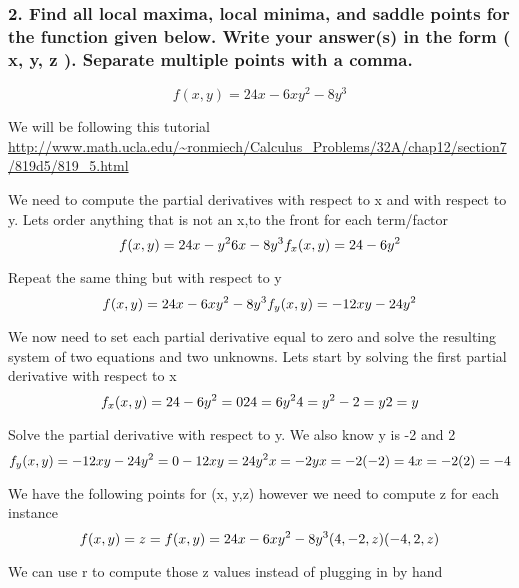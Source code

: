 \documentclass[
]{article}
\begin{document}
\hypertarget{find-all-local-maxima-local-minima-and-saddle-points-for-the-function-given-below.-write-your-answers-in-the-form-x-y-z-.-separate-multiple-points-with-a-comma.}{%
\subsubsection{2. Find all local maxima, local minima, and saddle points
for the function given below. Write your answer(s) in the form ( x, y, z
). Separate multiple points with a
comma.}\label{find-all-local-maxima-local-minima-and-saddle-points-for-the-function-given-below.-write-your-answers-in-the-form-x-y-z-.-separate-multiple-points-with-a-comma.}}

\[
f(x,y)=24x-6xy^{2}-8y^{3}
\]

We will be following this tutorial
\url{http://www.math.ucla.edu/~ronmiech/Calculus_Problems/32A/chap12/section7/819d5/819_5.html}

We need to compute the partial derivatives with respect to x and with
respect to y. Lets order anything that is not an x,to the front for each
term/factor \[
f(x,y)=24x-y^{2}6x-8y^{3}\\
f_{x}(x, y)=24-6y^{2}
\]

Repeat the same thing but with respect to y \[
f(x,y)=24x-6xy^{2}-8y^{3}\\
f_{y}(x, y)=-12xy-24y^{2}
\]

We now need to set each partial derivative equal to zero and solve the
resulting system of two equations and two unknowns. Lets start by
solving the first partial derivative with respect to x \[
f_{x}(x, y)=24-6y^{2}=0\\
24=6y^{2}\\
4=y^{2}\\
-2=y\\
2=y
\]

Solve the partial derivative with respect to y. We also know y is -2 and
2 \[
f_{y}(x, y)=-12xy-24y^{2}=0\\
-12xy=24y^{2}\\
x=-2y\\
x=-2(-2)=4\\
x=-2(2)=-4
\]

We have the following points for (x, y,z) however we need to compute z
for each instance \[
f(x, y)=z=f(x,y)=24x-6xy^{2}-8y^{3}\\
(4, -2, z)\\
(-4, 2, z)
\]

We can use r to compute those z values instead of plugging in by hand
\end{document}

